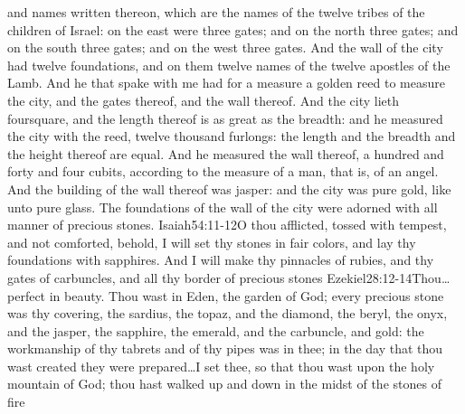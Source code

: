 and names written thereon, which are the names of the twelve tribes of the children of Israel:%
 on the east were three gates; and on the north three gates; and on the south three gates; and on the west three gates.
 And the wall of the city had twelve foundations, and on them twelve names of the twelve apostles of the Lamb. 
 And he that spake with me had for a measure a golden reed to measure the city, and the gates thereof, and the wall thereof.%
 And the city lieth foursquare, and the length thereof is as great as the breadth:%
 and he measured the city with the reed, twelve thousand furlongs: the length and the breadth and the height thereof are equal.%
 And he measured the wall thereof, a hundred and forty and four cubits, according to the measure of a man, that is, of an angel. 
 And the building of the wall thereof was jasper: and the city was pure gold, like unto pure glass. 
 The foundations of the wall of the city were adorned with all manner of precious stones.%
				{Isaiah}{54:11-12}{O thou afflicted, tossed with tempest, and not comforted, behold, I will set thy stones in fair colors, and lay thy foundations with sapphires. And I will make thy pinnacles of rubies, and thy gates of carbuncles, and all thy border of precious stones}%
				{Ezekiel}{28:12-14}{Thou\ldots perfect in beauty. Thou wast in Eden, the garden of God; every precious stone was thy covering, the sardius, the topaz, and the diamond, the beryl, the onyx, and the jasper, the sapphire, the emerald, and the carbuncle, and gold: the workmanship of thy tabrets and of thy pipes was in thee; in the day that thou wast created they were prepared\ldots I set thee, so that thou wast upon the holy mountain of God; thou hast walked up and down in the midst of the stones of fire} %
